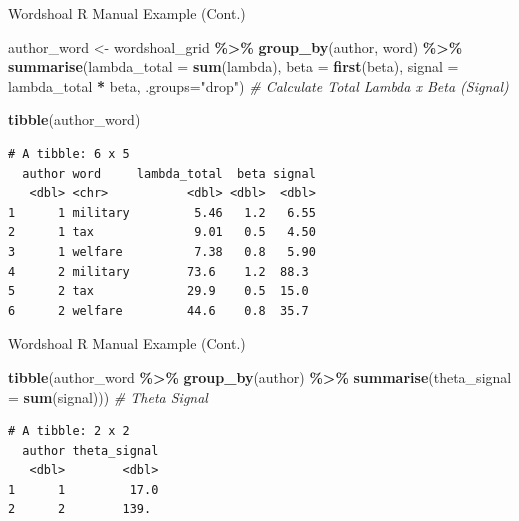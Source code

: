 \documentclass[
  ignorenonframetext,
  aspectratio=169]{beamer}
\newenvironment{Shaded}{\begin{snugshade}}{\end{snugshade}}
\newcommand{\AttributeTok}[1]{\textcolor[rgb]{0.13,0.29,0.53}{#1}}
\newcommand{\CommentTok}[1]{\textcolor[rgb]{0.56,0.35,0.01}{\textit{#1}}}
\newcommand{\FunctionTok}[1]{\textcolor[rgb]{0.13,0.29,0.53}{\textbf{#1}}}
\newcommand{\NormalTok}[1]{#1}
\newcommand{\OtherTok}[1]{\textcolor[rgb]{0.56,0.35,0.01}{#1}}
\newcommand{\SpecialCharTok}[1]{\textcolor[rgb]{0.81,0.36,0.00}{\textbf{#1}}}
\newcommand{\StringTok}[1]{\textcolor[rgb]{0.31,0.60,0.02}{#1}}
\begin{document}
\begin{frame}[fragile]{Wordshoal R Manual Example (Cont.)}
\label{wordshoal-r-manual-example-cont.-1}
\scriptsize

\begin{Shaded}
\begin{Highlighting}[]
\NormalTok{author\_word }\OtherTok{\textless{}{-}}\NormalTok{ wordshoal\_grid }\SpecialCharTok{\%\textgreater{}\%}
  \FunctionTok{group\_by}\NormalTok{(author, word) }\SpecialCharTok{\%\textgreater{}\%}
  \FunctionTok{summarise}\NormalTok{(}\AttributeTok{lambda\_total =} \FunctionTok{sum}\NormalTok{(lambda),}
            \AttributeTok{beta =} \FunctionTok{first}\NormalTok{(beta),}
            \AttributeTok{signal =}\NormalTok{ lambda\_total }\SpecialCharTok{*}\NormalTok{ beta, }\AttributeTok{.groups=}\StringTok{"drop"}\NormalTok{) }\CommentTok{\# Calculate Total Lambda x Beta (Signal)}

\FunctionTok{tibble}\NormalTok{(author\_word) }
\end{Highlighting}
\end{Shaded}

\begin{verbatim}
# A tibble: 6 x 5
  author word     lambda_total  beta signal
   <dbl> <chr>           <dbl> <dbl>  <dbl>
1      1 military         5.46   1.2   6.55
2      1 tax              9.01   0.5   4.50
3      1 welfare          7.38   0.8   5.90
4      2 military        73.6    1.2  88.3 
5      2 tax             29.9    0.5  15.0 
6      2 welfare         44.6    0.8  35.7 
\end{verbatim}
\end{frame}

\begin{frame}[fragile]{Wordshoal R Manual Example (Cont.)}
\label{wordshoal-r-manual-example-cont.-2}
\scriptsize

\begin{Shaded}
\begin{Highlighting}[]
\FunctionTok{tibble}\NormalTok{(author\_word }\SpecialCharTok{\%\textgreater{}\%}
  \FunctionTok{group\_by}\NormalTok{(author) }\SpecialCharTok{\%\textgreater{}\%}
  \FunctionTok{summarise}\NormalTok{(}\AttributeTok{theta\_signal =} \FunctionTok{sum}\NormalTok{(signal))) }\CommentTok{\# Theta Signal}
\end{Highlighting}
\end{Shaded}

\begin{verbatim}
# A tibble: 2 x 2
  author theta_signal
   <dbl>        <dbl>
1      1         17.0
2      2        139. 
\end{verbatim}
\end{frame}
\end{document}

